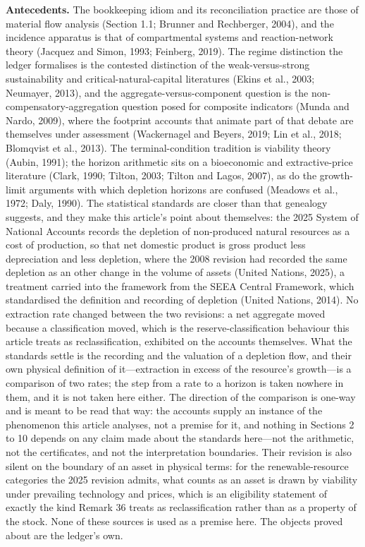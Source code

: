 \documentclass[11pt]{article}
\begin{document}
\textbf{Antecedents.} The bookkeeping idiom and its reconciliation practice are those of material flow
analysis (Section 1.1; Brunner and Rechberger, 2004), and the incidence apparatus is that of
compartmental systems and reaction-network theory (Jacquez and Simon, 1993; Feinberg, 2019). The
regime distinction the ledger formalises is the contested distinction of the weak-versus-strong
sustainability and critical-natural-capital literatures (Ekins et al., 2003; Neumayer, 2013), and
the aggregate-versus-component question is the non-compensatory-aggregation question posed for
composite indicators (Munda and Nardo, 2009), where the footprint accounts that animate part of that
debate are themselves under assessment (Wackernagel and Beyers, 2019; Lin et al., 2018; Blomqvist
et al., 2013). The terminal-condition tradition is viability theory (Aubin, 1991); the horizon
arithmetic sits on a bioeconomic and extractive-price literature (Clark, 1990; Tilton, 2003; Tilton
and Lagos, 2007), as do the growth-limit arguments with which depletion horizons are confused
(Meadows et al., 1972; Daly, 1990). The statistical standards are closer than that genealogy
suggests, and they make this article's point about themselves: the 2025 System of National Accounts
records the depletion of non-produced natural resources as a cost of production, so that net domestic
product is gross product less depreciation and less depletion, where the 2008 revision had recorded
the same depletion as an other change in the volume of assets (United Nations, 2025), a treatment
carried into the framework from the SEEA Central Framework, which standardised the definition and
recording of depletion (United Nations, 2014). No extraction rate changed between the two revisions:
a net aggregate moved because a classification moved, which is the reserve-classification behaviour
this article treats as reclassification, exhibited on the accounts themselves. What the standards
settle is the recording and the valuation of a depletion flow, and their own physical definition of it---extraction in excess of the resource's growth---is a comparison of two rates; the step from a
rate to a horizon is taken nowhere in them, and it is not taken here either. The direction of the
comparison is one-way and is meant to be read that way: the accounts supply an instance of the phenomenon this
article analyses, not a premise for it, and nothing in Sections 2 to 10 depends on any claim made about the
standards here---not the arithmetic, not the certificates, and not the interpretation boundaries. Their
revision is also silent on the boundary of an asset in physical terms: for the renewable-resource categories
the 2025 revision admits, what counts as an asset is drawn by viability under prevailing technology and
prices, which is an eligibility statement of exactly the kind Remark 36 treats as reclassification rather than
as a property of the stock. None of these sources is used as a premise here.
The objects proved about are the ledger's own.
\end{document}
